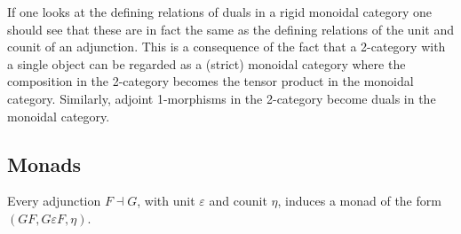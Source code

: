     \begin{remark}
        If one looks at the defining relations of duals in a rigid monoidal category one should see that these are in fact the same as the defining relations of the unit and counit of an adjunction. This is a consequence of the fact that a 2-category with a single object can be regarded as a (strict) monoidal category where the composition in the 2-category becomes the tensor product in the monoidal category. Similarly, adjoint 1-morphisms in the 2-category become duals in the monoidal category.
    \end{remark}

\subsection{Monads}


    \begin{example}[Adjunction]
        Every adjunction $F\dashv G$, with unit $\varepsilon$ and counit $\eta$, induces a monad of the form $(GF, G\varepsilon F, \eta)$.
    \end{example}


